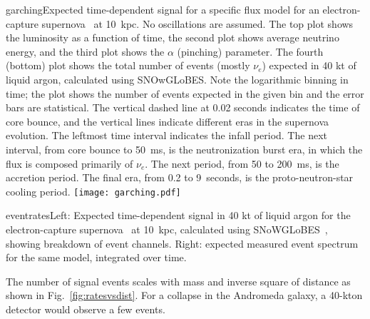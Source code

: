\begin{dunefigure}{garching}{Expected
  time-dependent signal for a specific flux model for an
  electron-capture supernova~\cite{Huedepohl:2009wh} at 10~kpc.  No oscillations are assumed. The
  top plot shows the luminosity as a function of time, the second plot
  shows average neutrino energy, and the third plot shows the $\alpha$
  (pinching) parameter.  The fourth (bottom) plot shows the total number of
  events (mostly $\nu_e$) expected in 40 kt of liquid argon, calculated using
  SNOwGLoBES.  Note the logarithmic binning in time; the plot shows
  the number of events expected in the given bin and the error bars
  are statistical. The vertical dashed line at 0.02 seconds indicates
  the time of core bounce, and the vertical lines indicate different
  eras in the supernova evolution.  The leftmost time interval
  indicates the infall period.  The next interval, from core bounce to
  50~ms, is the neutronization burst era, in which the flux is
  composed primarily of $\nu_e$.  The next period, from 50 to 200~ms,
  is the accretion period. The final era, from 0.2 to 9~seconds, is
  the proto-neutron-star cooling period.}
\texttt{[image: garching.pdf]}
\end{dunefigure}


\begin{dunefigure}{eventrates}{Left: Expected
  time-dependent signal in 40 kt of liquid argon for the electron-capture supernova~\cite{Huedepohl:2009wh} at 10~kpc, calculated using SNoWGLoBES~\cite{snowglobes}, showing breakdown of event channels.  Right: expected measured event spectrum for the same model, integrated over time.}
\end{dunefigure}

The number of signal events scales with mass and inverse square of distance as shown in Fig.~\ref{fig:ratesvsdist}.  For a collapse in the Andromeda galaxy, a 40-kton detector would observe a few events.


